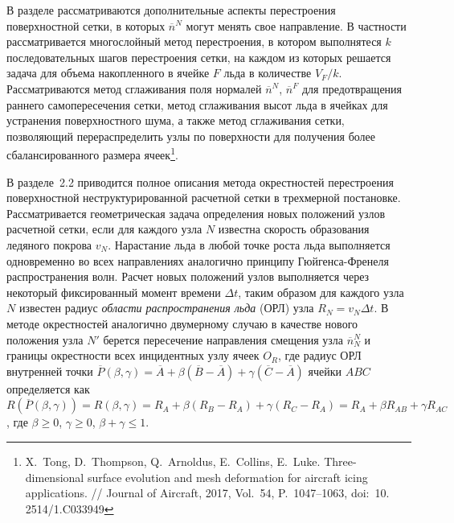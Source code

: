 \documentclass[a4paper,14pt]{extarticle}                     %
\theoremstyle{plain}                                         %
\begin{document}
В разделе рассматриваются дополнительные аспекты перестроения поверхностной сетки, в которых $\overline{n}^N$ могут менять свое направление.
В частности рассматривается многослойный метод перестроения, в котором выполнятеся $k$ последовательных шагов перестроения сетки, на каждом из которых решается задача для объема накопленного в ячейке $F$ льда в количестве $V_F/k$.
Рассматриваются метод сглаживания поля нормалей $\overline{n}^N$, $\overline{n}^F$ для предотвращения раннего самопересечения сетки, метод сглаживания высот льда в ячейках для устранения поверхностного шума, а также метод сглаживания сетки, позволяющий перераспределить узлы по поверхности для получения более сбалансированного размера ячеек\footnote[1]{X.~Tong, D.~Thompson, Q.~Arnoldus, E.~Collins, E.~Luke. Three-dimensional surface evolution and mesh deformation for aircraft icing applications. // Journal of Aircraft, 2017, Vol.~54, P.~1047–1063, doi:~10.
2514/1.C033949}.


В разделе~2.2 приводится полное описания метода окрестностей перестроения поверхностной неструктурированной расчетной сетки в трехмерной постановке.
Рассматривается геометрическая задача определения новых положений узлов расчетной сетки, если для каждого узла $N$ известна скорость образования ледяного покрова $v_N$.
Нарастание льда в любой точке роста льда выполняется одновременно во всех направлениях аналогично принципу Гюйгенса-Френеля распространения волн.
Расчет новых положений узлов выполняется через некоторый фиксированный момент времени $\Delta t$, таким образом для каждого узла $N$ известен радиус \textit{области распространения льда} (ОРЛ) узла $R_N = v_N \Delta t$.
В методе окрестностей аналогично двумерному случаю в качестве нового положения узла $N'$ берется пересечение направления смещения узла $\overline{n}_N^N$ и границы окрестности всех инцидентных узлу ячеек $O_R$, где радиус ОРЛ внутренней точки $\overline{P}(\beta, \gamma) = \overline{A} + \beta (\overline{B} - \overline{A}) + \gamma (\overline{C} - \overline{A})$ ячейки $ABC$ определяется как $R(\overline{P}(\beta,\gamma)) = R(\beta,\gamma) = R_A + \beta(R_B - R_A) + \gamma(R_C - R_A) = R_A + \beta R_{AB} + \gamma R_{AC}$, где $\beta \ge 0$, $\gamma \ge 0$, $\beta + \gamma \le 1$.
\end{document}
